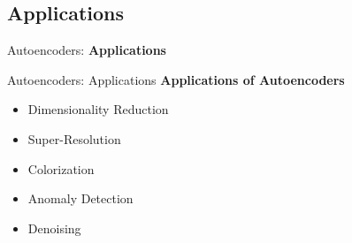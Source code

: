 \subsection{Applications}
\begin{frame}{}
    \LARGE Autoencoders: \textbf{Applications}
\end{frame}

\begin{frame}{Autoencoders: Applications}
    \centering
    \large{\textbf{Applications of Autoencoders}}
    \begin{itemize}
        \item Dimensionality Reduction
        \item Super-Resolution
        \item Colorization
        \item Anomaly Detection
        \item Denoising
    \end{itemize}
\end{frame}











